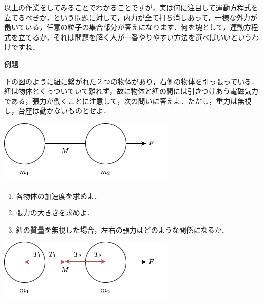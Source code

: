 \documentclass[
  b4paperpaper,
  xelatex,ja=standard]{bxjsbook}
\providecommand{\tightlist}{%
  \setlength{\itemsep}{0pt}\setlength{\parskip}{0pt}}\usepackage{longtable,booktabs,array}
\begin{document}
以上の作業をしてみることでわかることですが，実は何に注目して運動方程式を立てるべきか，という問題に対して，内力が全て打ち消しあって，一様な外力が働いている，任意の粒子の集合部分が答えになります．何を塊として，運動方程式を立てるか，それは問題を解く人が一番やりやすい方法を選べばいいというわけですね．

\begin{Rbox}{例題}

下の図のように紐に繋がれた２つの物体があり，右側の物体を引っ張っている．紐は物体とくっついていて離れず，故に物体と紐の間には引きつけあう電磁気力である，張力が働くことに注意して，次の問いに答えよ．ただし，重力は無視し，台座は動かないものとせよ．

\includegraphics{source/images/newton/newton5.png}

\begin{enumerate}
\def\labelenumi{\arabic{enumi}.}
\tightlist
\item
  各物体の加速度を求めよ．
\item
  張力の大きさを求めよ．
\item
  紐の質量を無視した場合，左右の張力はどのような関係になるか．
\end{enumerate}

\end{Rbox}


\includegraphics{source/images/newton/newton6.png}
\end{document}
